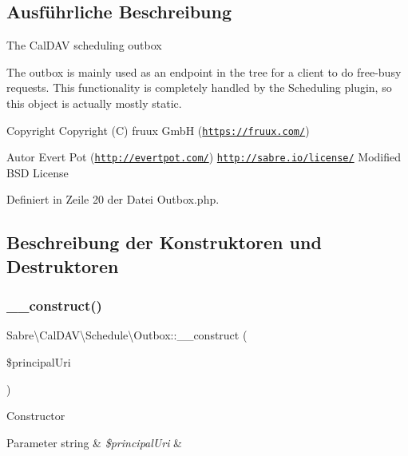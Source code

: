 \subsection{Ausführliche Beschreibung}
The Cal\+D\+AV scheduling outbox

The outbox is mainly used as an endpoint in the tree for a client to do free-\/busy requests. This functionality is completely handled by the Scheduling plugin, so this object is actually mostly static.

\begin{DoxyCopyright}{Copyright}
Copyright (C) fruux GmbH (\href{https://fruux.com/}{\tt https\+://fruux.\+com/}) 
\end{DoxyCopyright}
\begin{DoxyAuthor}{Autor}
Evert Pot (\href{http://evertpot.com/}{\tt http\+://evertpot.\+com/})  \href{http://sabre.io/license/}{\tt http\+://sabre.\+io/license/} Modified B\+SD License 
\end{DoxyAuthor}


Definiert in Zeile 20 der Datei Outbox.\+php.



\subsection{Beschreibung der Konstruktoren und Destruktoren}
\mbox{\label{class_sabre_1_1_cal_d_a_v_1_1_schedule_1_1_outbox_af891d7fb8b26472c5b27ce4522a5456f}} 
\subsubsection{\texorpdfstring{\+\_\+\+\_\+construct()}{\_\_construct()}}
{\footnotesize\ttfamily Sabre\textbackslash{}\+Cal\+D\+A\+V\textbackslash{}\+Schedule\textbackslash{}\+Outbox\+::\+\_\+\+\_\+construct (\begin{DoxyParamCaption}\item[{}]{\$principal\+Uri }\end{DoxyParamCaption})}

Constructor


\begin{DoxyParams}[1]{Parameter}
string & {\em \$principal\+Uri} & \\
\hline
\end{DoxyParams}


